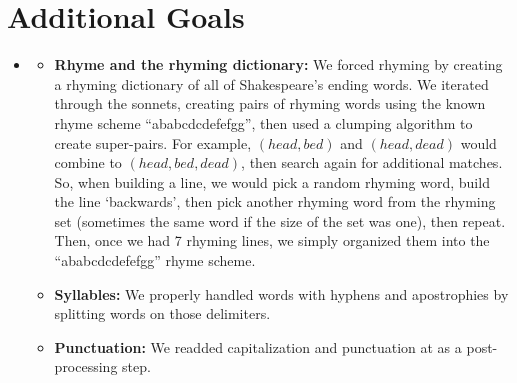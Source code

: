 
\section{Additional Goals}
\medskip
\begin{itemize}

    \item {}

    \begin{itemize}
    \item \textbf{Rhyme and the rhyming dictionary:} We forced rhyming by creating a rhyming dictionary of all of Shakespeare's ending words. We iterated through the sonnets, creating pairs of rhyming words using the known rhyme scheme ``ababcdcdefefgg'', then used a clumping algorithm to create super-pairs. For example, $(head, bed)$ and $(head, dead)$ would combine to $(head,bed,dead)$, then search again for additional matches. So, when building a line, we would pick a random rhyming word, build the line `backwards', then pick another rhyming word from the rhyming set (sometimes the same word if the size of the set was one), then repeat. Then, once we had 7 rhyming lines, we simply organized them into the ``ababcdcdefefgg'' rhyme scheme.
    \item \textbf{Syllables:} We properly handled words with hyphens and
    apostrophies by splitting words on those delimiters.
    \item \textbf{Punctuation:} We readded capitalization and punctuation at
    as a post-processing step.
    \end{itemize}

\end{itemize}



